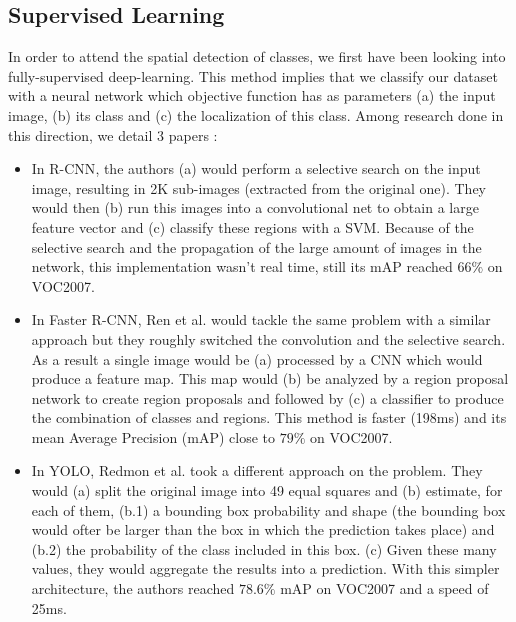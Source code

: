 		\subsection{Supervised Learning}
		\label{sub:supervised_learning}
			In order to attend the spatial detection of classes, we first have been looking into fully-supervised deep-learning. This method implies that we classify our dataset with a neural network which objective function has as parameters (a) the input image, (b) its class and (c) the localization of this class. Among research done in this direction, we detail 3 papers :
			\begin{itemize}
				\item In R-CNN\cite{girshick2014rich}, the authors (a) would perform a selective search on the input image, resulting in 2K sub-images (extracted from the original one). They would then (b) run this images into a convolutional net to obtain a large feature vector and (c) classify these regions with a SVM. Because of the selective search and the propagation of the large amount of images in the network, this implementation wasn't real time, still its mAP reached $66\%$ on VOC2007.
				\item In Faster R-CNN\cite{ren2015faster}, Ren et al. would tackle the same problem with a similar approach but they roughly switched the convolution and the selective search. As a result a single image would be (a) processed by a CNN which would produce a feature map. This map would (b) be analyzed by a region proposal network to create region proposals and followed by (c) a classifier to produce the combination of classes and regions. This method is faster (198ms) and its mean Average Precision (mAP) close to $79\%$ on VOC2007. %
				\item In YOLO\cite{redmon2015you}, Redmon et al. took a different approach on the problem. They would (a) split the original image into 49 equal squares and (b) estimate, for each of them, (b.1) a bounding box probability and shape (the bounding box would ofter be larger than the box in which the prediction takes place) and (b.2) the probability of the class included in this box. (c) Given these many values, they would aggregate the results into a prediction. With this simpler architecture, the authors reached $78.6\%$ mAP on VOC2007 and a speed of 25ms.
			\end{itemize}

